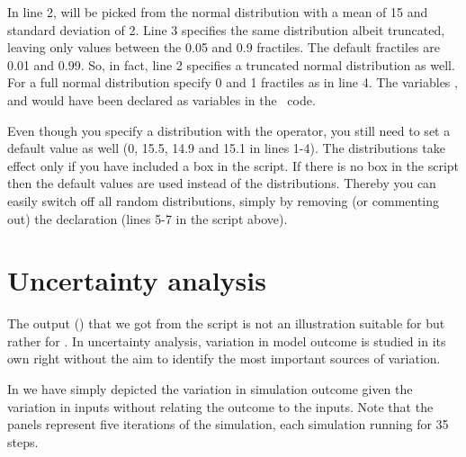In line 2,  will be picked from the normal distribution with a mean of 15 and standard deviation of 2. Line 3 specifies the same distribution albeit truncated, leaving only values between the 0.05 and 0.9 fractiles. The default fractiles are 0.01 and 0.99. So, in fact, line 2 specifies a truncated normal distribution as well. For a full normal distribution specify 0 and 1 fractiles as in line 4. The variables ,  and  would have been declared as  variables in the \CPP\ code.

Even though you specify a distribution with the  operator, you still need to set a default value as well (0, 15.5, 14.9 and 15.1 in lines 1-4). The  distributions take effect only if you have included a  box in the script. If there is no  box in the script then the default values are used instead of the  distributions. Thereby you can easily switch off all random  distributions, simply by removing (or commenting out) the  declaration (lines 5-7 in the script above).

\section{Uncertainty analysis}
The output () that we got from the  script is not an illustration suitable for  but rather for . In uncertainty analysis, variation in model outcome is studied in its own right without the aim to identify the most important sources of variation. 

In  we have simply depicted the variation in simulation outcome given the variation in inputs without relating the outcome to the inputs. Note that the panels represent five iterations of the simulation, each simulation running for 35 steps. 

